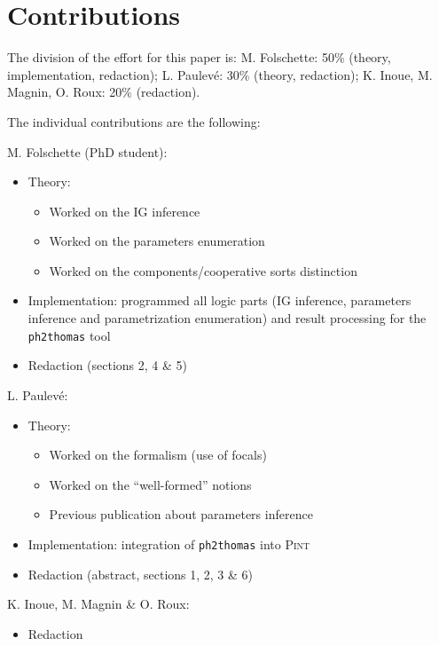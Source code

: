 \appendix
\section*{Contributions}

The division of the effort for this paper is: M. Folschette: 50\% (theory, implementation, redaction); L. Paulev\'e: 30\%
(theory, redaction); K. Inoue, M. Magnin, O. Roux: 20\% (redaction).

\medskip

The individual contributions are the following:

\medskip

\noindent
M. Folschette (PhD student):
\begin{itemize}
  \item Theory:
  \begin{itemize}
    \item Worked on the IG inference
    \item Worked on the parameters enumeration
    \item Worked on the components/cooperative sorts distinction
  \end{itemize}
  \item Implementation: programmed all logic parts (IG inference, parameters inference and parametrization enumeration) and result processing for the \texttt{ph2thomas} tool
  \item Redaction (sections 2, 4 \& 5)
\end{itemize}

\noindent
L. Paulevé:
\begin{itemize}
  \item Theory:
  \begin{itemize}
    \item Worked on the formalism (use of focals)
    \item Worked on the “well-formed” notions
    \item Previous publication about parameters inference
  \end{itemize}
  \item Implementation: integration of \texttt{ph2thomas} into \textsc{Pint}
  \item Redaction (abstract, sections 1, 2, 3 \& 6)
\end{itemize}

\noindent
K. Inoue, M. Magnin \& O. Roux:
\begin{itemize}
  \item Redaction
\end{itemize}
